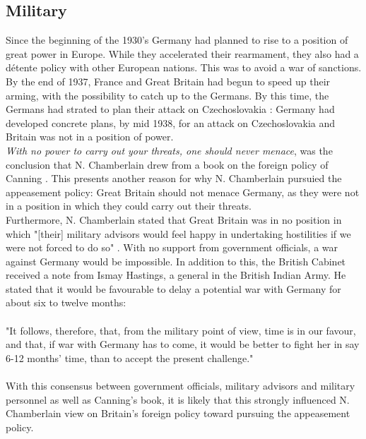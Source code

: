 \documentclass[10pt, a4papert, hidelinks]{article}
\begin{document}
\subsection{Military} %


Since the beginning of the 1930's Germany had planned to rise to a position of great power in Europe. While they accelerated their rearmament, they also had a détente policy with other European nations. This was to avoid a war of sanctions. By the end of 1937, France and Great Britain had begun to speed up their arming, with the possibility to catch up to the Germans. By this time, the Germans had strated to plan their attack on Czechoslovakia \cite{muenchen_ende_altes_europa} : Germany had developed concrete plans, by mid 1938, for an attack on Czechoslovakia and Britain was not in a position of power.\\
\emph{With no power to carry out your threats, one should never menace}, was the conclusion that N. Chamberlain drew from a book on the foreign policy of Canning \cite{chamberlain_neville_2000}. This presents another reason for why N. Chamberlain pursuied the appeasement policy: Great Britain should not menace Germany, as they were not in a position in which they could carry out their threats.\\
Furthermore, N. Chamberlain stated that Great Britain was in no position in which "[their] military advisors would feel happy in undertaking hostilities if we were not forced to do so" \cite{chamberlain_neville_2000}. With no support from government officials, a war against Germany would be impossible. In addition to this, the British Cabinet received a note from Ismay Hastings, a general in the British Indian Army. He stated that it would be favourable to delay a potential war with Germany for about six to twelve months:\\\\
"It follows, therefore, that, from the military point of view, time is in our favour, and that, if war with Germany has to come, it would be better to fight her in say 6-12 months’ time, than to accept the present challenge." \cite{ismay1938}\\\\
With this consensus between government officials, military advisors and military personnel as well as Canning's book, it is likely that this strongly influenced N. Chamberlain view on Britain's foreign policy toward pursuing the appeasement policy.
\end{document}
